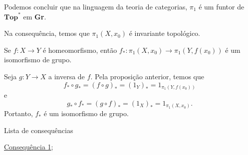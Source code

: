 Podemos concluir que na linguagem da teoria de categorias, $\pi_1$ é um funtor de $\textbf{Top}^*$ em \textbf{Gr}. 

Na consequência, temos que $\pi_1(X,x_0)$ é invariante topológico.

\begin{corol}
    Se $f:X\rightarrow Y$ é homeomorfismo, então $f_*:\pi_1 (X,x_0)\rightarrow \pi_1(Y,f(x_0))$ é um isomorfismo de grupo.
\end{corol}

\begin{dem}
    Seja $g:Y\rightarrow X$ a inversa de $f.$ Pela proposição anterior, temos que 
    $$f_*\circ g_*=(f\circ g)_*=(1_Y)_*=1_{\pi_1(Y,f(x_0))}$$
    e 
    $$g_*\circ f_*=(g\circ f)_*=(1_X)_*=1_{\pi_1 (X,x_0)}.$$
    Portanto, $f_*$ é um isomorfismo de grupo.
\end{dem}

\begin{titlemize}{Lista de consequências}
	\item \hyperref[consequencia1]{Consequência 1};\\ %
	\item \hyperref[]{}
\end{titlemize}
